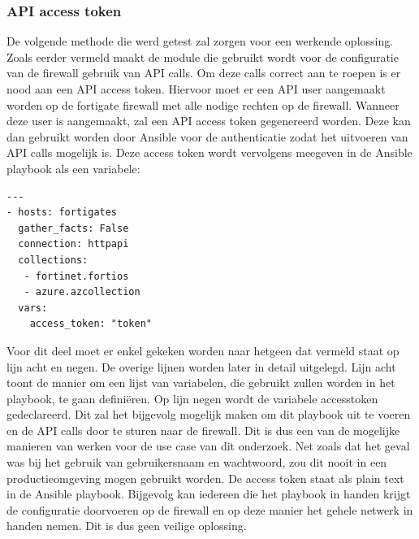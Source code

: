 \subsubsection{API access token}
\label{subsub: access token}
De volgende methode die werd getest zal zorgen voor een werkende oplossing. Zoals eerder vermeld maakt de module die gebruikt wordt voor de configuratie van de firewall gebruik van API calls. Om deze calls correct aan te roepen is er nood aan een API access token. Hiervoor moet er een API user aangemaakt worden op de fortigate firewall met alle nodige rechten op de firewall. Wanneer deze user is aangemaakt, zal een API access token gegenereerd worden. Deze kan dan gebruikt worden door Ansible voor de authenticatie zodat het uitvoeren van API calls mogelijk is. Deze access token wordt vervolgens meegeven in de Ansible playbook als een variabele:
\begin{lstlisting}[caption={Snippet top of playbook main.yml}]
    ---
- hosts: fortigates
  gather_facts: False
  connection: httpapi                                       
  collections:
   - fortinet.fortios
   - azure.azcollection
  vars:
    access_token: "token"
\end{lstlisting}
Voor dit deel moet er enkel gekeken worden naar hetgeen dat vermeld staat op lijn acht en negen. De overige lijnen worden later in detail uitgelegd. Lijn acht toont de manier om een lijst van variabelen, die gebruikt zullen worden in het playbook, te gaan definiëren. Op lijn negen wordt de variabele access\textunderscore token gedeclareerd. Dit zal het bijgevolg mogelijk maken om dit playbook uit te voeren en de API calls door te sturen naar de firewall. Dit is dus een van de mogelijke manieren van werken voor de use case van dit onderzoek. Net zoals dat het geval was bij het gebruik van gebruikersnaam en wachtwoord, zou dit nooit in een productieomgeving mogen gebruikt worden. De access token staat als plain text in de Ansible playbook. Bijgevolg kan iedereen die het playbook in handen krijgt de configuratie doorvoeren op de firewall en op deze manier het gehele netwerk in handen nemen. Dit is dus geen veilige oplossing.

